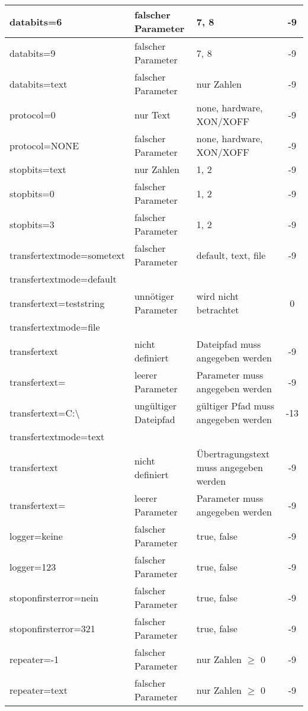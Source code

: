 \begin{longtable}{||l|p{3cm}|p{5cm}|c||}
databits=6    & falscher Parameter & 7, 8       & -9\\ \hline
databits=9    & falscher Parameter & 7, 8       & -9\\ \hline
databits=text & falscher Parameter & nur Zahlen & -9\\ \hline\hline

protocol=0    & nur Text             & none, hardware, XON/XOFF & -9\\ \hline
protocol=NONE & falscher Parameter & none, hardware, XON/XOFF & -9\\ \hline\hline

stopbits=text & nur Zahlen           & 1, 2 & -9\\ \hline
stopbits=0    & falscher Parameter & 1, 2 & -9\\ \hline
stopbits=3    & falscher Parameter & 1, 2 & -9\\ \hline\hline

transfertextmode=sometext & falscher Parameter & default, text, file   & -9\\ \hline
transfertextmode=default  & & &\\
transfertext=teststring   & unnötiger Parameter  & wird nicht betrachtet & 0 \\ \hline

transfertextmode=file & & &\\
transfertext                  & nicht definiert      & Dateipfad muss angegeben werden     & -9\\ \cline{2-4}
transfertext=                 & leerer Parameter     & Parameter muss angegeben werden     & -9\\ \cline{2-4}
transfertext=C:\textbackslash & ungültiger Dateipfad & gültiger Pfad muss angegeben werden & -13\\ \hline\hline

transfertextmode=text & & &\\
transfertext                  & nicht definiert      & Übertragungstext muss angegeben werden & -9\\ \cline{2-4}
transfertext=                 & leerer Parameter     & Parameter muss angegeben werden        & -9\\ \hline\hline

logger=keine & falscher Parameter & true, false & -9\\ \hline
logger=123   & falscher Parameter & true, false & -9\\ \hline\hline

stoponfirsterror=nein & falscher Parameter & true, false & -9\\ \hline
stoponfirsterror=321  & falscher Parameter & true, false & -9\\ \hline\hline

repeater=-1   & falscher Parameter & nur Zahlen $\geq$ 0 & -9\\ \hline
repeater=text & falscher Parameter & nur Zahlen $\geq$ 0 & -9\\ \hline\hline

\end{longtable}



